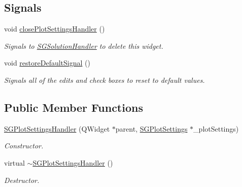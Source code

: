 \subsection*{Signals}
\begin{DoxyCompactItemize}
\item 
\mbox{\label{classSGPlotSettingsHandler_a3fff365dabc487195fee2d5999db9edd}} 
void \hyperlink{classSGPlotSettingsHandler_a3fff365dabc487195fee2d5999db9edd}{close\+Plot\+Settings\+Handler} ()
\begin{DoxyCompactList}\small\item\em Signals to \hyperlink{classSGSolutionHandler}{S\+G\+Solution\+Handler} to delete this widget. \end{DoxyCompactList}\item 
\mbox{\label{classSGPlotSettingsHandler_a2bbbfd94bd4ce4745a3e99129ff9dbc3}} 
void \hyperlink{classSGPlotSettingsHandler_a2bbbfd94bd4ce4745a3e99129ff9dbc3}{restore\+Default\+Signal} ()
\begin{DoxyCompactList}\small\item\em Signals all of the edits and check boxes to reset to default values. \end{DoxyCompactList}\end{DoxyCompactItemize}
\subsection*{Public Member Functions}
\begin{DoxyCompactItemize}
\item 
\mbox{\label{classSGPlotSettingsHandler_a946a8123eae0929b6dedb2d36d102ce8}} 
\hyperlink{classSGPlotSettingsHandler_a946a8123eae0929b6dedb2d36d102ce8}{S\+G\+Plot\+Settings\+Handler} (Q\+Widget $\ast$parent, \hyperlink{classSGPlotSettings}{S\+G\+Plot\+Settings} $\ast$\+\_\+plot\+Settings)
\begin{DoxyCompactList}\small\item\em Constructor. \end{DoxyCompactList}\item 
\mbox{\label{classSGPlotSettingsHandler_ade913c6e411f2a3ae0e5b50071ff4363}} 
virtual \hyperlink{classSGPlotSettingsHandler_ade913c6e411f2a3ae0e5b50071ff4363}{$\sim$\+S\+G\+Plot\+Settings\+Handler} ()
\begin{DoxyCompactList}\small\item\em Destructor. \end{DoxyCompactList}\end{DoxyCompactItemize}
